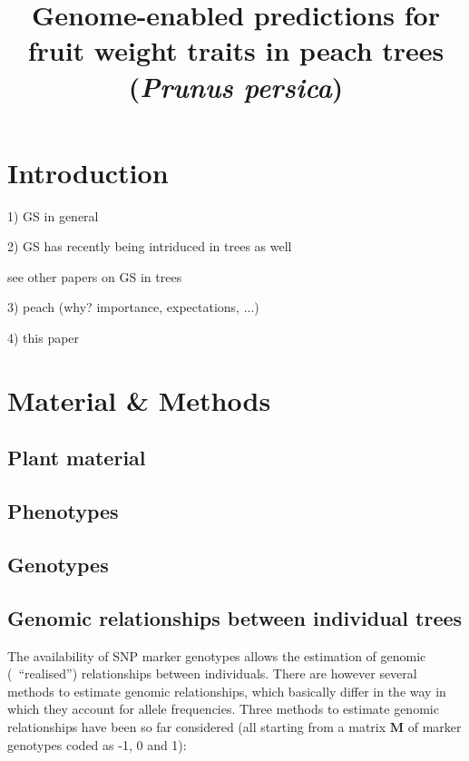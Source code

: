 \documentclass[english,11pt,a4paper]{scrartcl}
\begin{document}
\title{Genome-enabled predictions for fruit weight traits in peach trees
(\emph{Prunus persica})}

\date{}
\maketitle

\section*{Introduction}

1) GS in general

2) GS has recently being intriduced in trees as well

see other papers on GS in trees

3) peach (why? importance, expectations, ...)

4) this paper

\section*{Material \& Methods}

\subsection*{Plant material}

\subsection*{Phenotypes}

\subsection*{Genotypes}

\subsection*{Genomic relationships between individual trees}
The availability of SNP marker genotypes allows the estimation of
genomic (~``realised'') relationships between individuals. There are
however several methods to estimate genomic relationships, which
basically differ in the way in which they account for allele
frequencies.
Three methods to estimate genomic relationships have been so far
considered (all starting from a matrix $\boldsymbol{M}$ of marker genotypes coded as -1,
0 and 1): 
\end{document}
